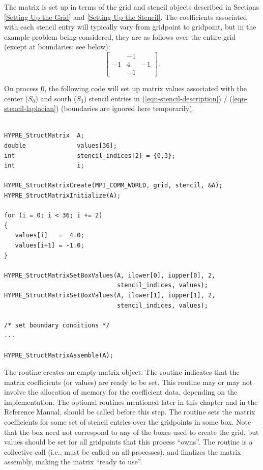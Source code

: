 The matrix is set up in terms of the grid and stencil objects
described in Sections
\ref{Setting Up the Grid} and \ref{Setting Up the Stencil}.
The coefficients associated with each stencil entry will typically
vary from gridpoint to gridpoint, but in the example problem being
considered, they are as follows over the entire grid (except at
boundaries; see below):
\begin{equation}\label{eqn-stencil-laplacian}
\left [
\begin{array}{ccc}
    & -1 &    \\
 -1 &  4 & -1 \\
    & -1 &    
\end{array}
\right ] .
\end{equation}

On process 0, the following code will set up matrix values associated
with the center ($S_0$) and south ($S_3$) stencil entries in
(\ref{eqn-stencil-description}) / (\ref{eqn-stencil-laplacian})
(boundaries are ignored here temporarily).
\begin{display}
\begin{verbatim}

HYPRE_StructMatrix  A;
double              values[36];
int                 stencil_indices[2] = {0,3};
int                 i;

HYPRE_StructMatrixCreate(MPI_COMM_WORLD, grid, stencil, &A);
HYPRE_StructMatrixInitialize(A);

for (i = 0; i < 36; i += 2)
{
   values[i]   =  4.0;
   values[i+1] = -1.0;
}

HYPRE_StructMatrixSetBoxValues(A, ilower[0], iupper[0], 2,
                               stencil_indices, values);
HYPRE_StructMatrixSetBoxValues(A, ilower[1], iupper[1], 2,
                               stencil_indices, values);

/* set boundary conditions */
...

HYPRE_StructMatrixAssemble(A);

\end{verbatim}
\end{display}
The  routine creates an empty matrix
object.  The  routine indicates
that the matrix coefficients (or values) are ready to be set.  This
routine may or may not involve the allocation of memory for the
coefficient data, depending on the implementation.  The optional
 routines mentioned later in this chapter and in the
Reference Manual, should be called before this step.  The
 routine sets the matrix
coefficients for some set of stencil entries over the gridpoints in
some box.  Note that the box need not correspond to any of the boxes
used to create the grid, but values should be set for all gridpoints
that this process ``owns''.  The 
routine is a collective call (i.e., must be called on all processes),
and finalizes the matrix assembly, making the matrix ``ready to use''.

